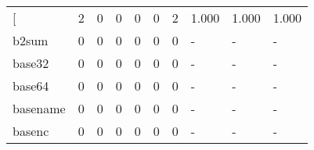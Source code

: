 \begin{longtable}{lp{2.0cm}p{2.0cm}p{2.0cm}p{2.0cm}p{2.0cm}p{2.0cm}p{2.0cm}p{2.0cm}p{2.0cm}}
\bottomrule
\endlastfoot
{[}         &                      2 &                                             0 &                                            0 &                                           0 &                                            0 &                                          2 &                                1.000 &                                  1.000 &                                1.000 \\
b2sum     &                      0 &                                             0 &                                            0 &                                           0 &                                            0 &                                          0 &                                    - &                                      - &                                    - \\
base32    &                      0 &                                             0 &                                            0 &                                           0 &                                            0 &                                          0 &                                    - &                                      - &                                    - \\
base64    &                      0 &                                             0 &                                            0 &                                           0 &                                            0 &                                          0 &                                    - &                                      - &                                    - \\
basename  &                      0 &                                             0 &                                            0 &                                           0 &                                            0 &                                          0 &                                    - &                                      - &                                    - \\
basenc    &                      0 &                                             0 &                                            0 &                                           0 &                                            0 &                                          0 &                                    - &                                      - &                                    - \\

\end{longtable}
